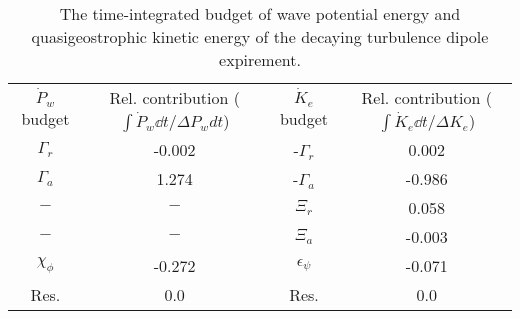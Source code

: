 \begin{table}
\begin{center}
\caption{The time-integrated budget of wave potential energy and quasigeostrophic                kinetic energy of the decaying turbulence dipole expirement. \label{table2}}
\begin{tabular}{cccc}
$\dot{P}_w$ budget & Rel. contribution ($\int\dot{P}_w \dd t/\Delta P_w dt$) & $\dot{K}_e$ budget & Rel. contribution ($\int\dot{K}_e \dd t/\Delta K_e$) \\
$\Gamma_r$ & -0.002 & -$\Gamma_r$ & 0.002 \\
$\Gamma_a$ & 1.274 & -$\Gamma_a$ & -0.986 \\
$-$ & $-$ & $\Xi_r$ & 0.058 \\
$-$ & $-$ & $\Xi_a$ & -0.003 \\
$\chi_\phi$ & -0.272 & $\epsilon_\psi$ & -0.071 \\
Res. & 0.0 & Res. & 0.0 \\
\end{tabular}
\end{center}
\end{table}
